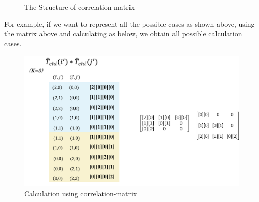 \documentclass{article}[12pt]
\numberwithin{equation}{section}
\begin{document}
\begin{spacing}{1.5}
\begin{figure}[htbp]
  \caption{The Structure of correlation-matrix}
\end{figure}
For example, if we want to represent all the possible cases as shown above, using the matrix above and calculating as below, we obtain all possible calculation cases.
\begin{figure}[htbp]
  \centerline{\includegraphics[width=12cm]{TexFigure/Tmat3.png}}
  \caption{Calculation using correlation-matrix}
\end{figure}

\pagebreak

\end{spacing}
\end{document}
